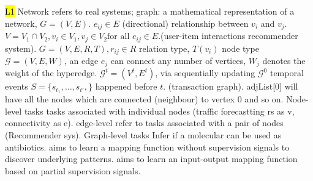\hl{L1} Network refers to real systems; graph: a mathematical representation of a network, $G=(V,E)$. $e_{ij}\in E$ (directional) relationship between $v_i$ and $v_j$. 
$V=V_1 \cap V_2, v_i \in V_1, v_j \in V_2 \text{for all } e_{ij} \in E$.(user-item interactions recommender system).
$G=(V,E,R,T), r_{ij} \in R$ relation type, $T(v_i)$ node type
 \( \mathcal{G} = (V, E, W) \), an edge \( e_j \) can connect any number of vertices, \( W_j \) denotes the weight of the hyperedge. 
 \( \mathcal{G}^t = (V^t, E^t) \), via sequentially updating \( \mathcal{G}^0 \) temporal events \( S = \{s_{t_1}, \dots, s_{t'}, \} \) happened before \( t \).  (transaction graph).
 adjList[0] will have all the nodes which are connected (neighbour) to vertex 0 and so on. 
 Node-level tasks tasks associated with individual nodes (traffic forecastting rs as v, connectivity as e). edge-level refer to tasks associated with a pair of nodes (Recommender sys). Graph-level tasks Infer if a molecular can be used as antibiotics. 
 aims to learn a mapping function without supervision signals to discover underlying patterns.
 aims to learn an input-output mapping function based on partial supervision signals.


